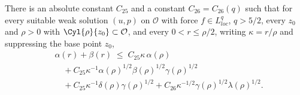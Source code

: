\documentclass[11pt,reqno]{amsart}
\begin{document}
\begin{lemma}
\label{lem:caccioppoli}
There is an absolute constant $C_{25}$ and a constant $C_{26}=C_{26}(q)$ such
that for every suitable weak solution $(u,p)$ on $\mathcal{O}$ with force
$f\in L^{q}_{loc}$, $q>5/2$, every $z_{0}$ and $\rho>0$ with
$\Cyl{\rho}{z_{0}}\subset\mathcal{O}$, and every $0<r\le\rho/2$, writing
$\kappa=r/\rho$ and suppressing the base point $z_{0}$,
\begin{equation}\label{eq:caccioppoli}\begin{aligned}
  &\alpha(r)+\beta(r)\;\le\;
    C_{25}\kappa\,\alpha(\rho)
   \\ &\quad+C_{25}\kappa^{-1}\alpha(\rho)^{1/2}\beta(\rho)^{1/2}\gamma(\rho)^{1/2}
   \\ &\quad+C_{25}\kappa^{-1}\delta(\rho)\gamma(\rho)^{1/2}
   +C_{26}\kappa^{-1/2}\gamma(\rho)^{1/2}\lambda(\rho)^{1/2}.
\end{aligned}\end{equation}
\end{lemma}
\end{document}
